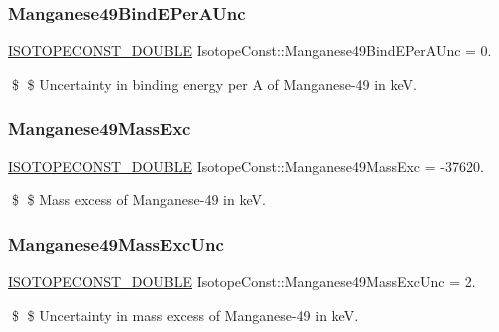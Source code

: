 \subsubsection{\texorpdfstring{Manganese49\+Bind\+E\+Per\+A\+Unc}{Manganese49BindEPerAUnc}}
{\footnotesize\ttfamily \mbox{\hyperlink{group___isotope_const-_macros_ga8f45a7272ce02c0b4c65c44636ed719a}{I\+S\+O\+T\+O\+P\+E\+C\+O\+N\+S\+T\+\_\+\+D\+O\+U\+B\+LE}} Isotope\+Const\+::\+Manganese49\+Bind\+E\+Per\+A\+Unc = 0.}

\$ \$ Uncertainty in binding energy per A of Manganese-\/49 in keV. \mbox{\label{group___isotope_const-_manganese-_mn49_ga9562a4cb8c0b09f334e323b6001e5792}} 
\subsubsection{\texorpdfstring{Manganese49\+Mass\+Exc}{Manganese49MassExc}}
{\footnotesize\ttfamily \mbox{\hyperlink{group___isotope_const-_macros_ga8f45a7272ce02c0b4c65c44636ed719a}{I\+S\+O\+T\+O\+P\+E\+C\+O\+N\+S\+T\+\_\+\+D\+O\+U\+B\+LE}} Isotope\+Const\+::\+Manganese49\+Mass\+Exc = -\/37620.}

\$ \$ Mass excess of Manganese-\/49 in keV. \mbox{\label{group___isotope_const-_manganese-_mn49_ga8c125769793526ee523006c2f244ee6a}} 
\subsubsection{\texorpdfstring{Manganese49\+Mass\+Exc\+Unc}{Manganese49MassExcUnc}}
{\footnotesize\ttfamily \mbox{\hyperlink{group___isotope_const-_macros_ga8f45a7272ce02c0b4c65c44636ed719a}{I\+S\+O\+T\+O\+P\+E\+C\+O\+N\+S\+T\+\_\+\+D\+O\+U\+B\+LE}} Isotope\+Const\+::\+Manganese49\+Mass\+Exc\+Unc = 2.}

\$ \$ Uncertainty in mass excess of Manganese-\/49 in keV. \mbox{\label{group___isotope_const-_manganese-_mn49_gae95593dc1215ee8626fca39ef8c7430b}} 
